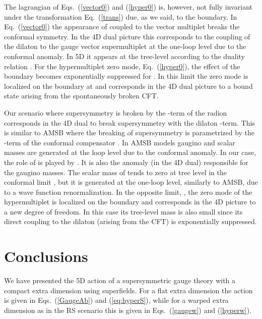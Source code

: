 \documentclass[a4paper,12pt]{article}
\begin{document}
The lagrangian  of Eqs.~(\ref{vector0}) 
and (\ref{hyper0})
is, however,  not fully invariant under the transformation
Eq.~(\ref{trans}) due, as we said,  
to the  \coordHE{} boundary.
In Eq.~(\ref{vector0}) 
the appearance  of \coordHE{} coupled to the vector multiplet
breaks the conformal symmetry.
In the 4D dual picture this corresponds to 
the coupling of  the dilaton  to the gauge vector supermultiplet
at the one-loop level due to the conformal anomaly.
In 5D it appears at 
the tree-level according to the 
duality relation \cite{arp}
\coordHE{}.
For the hypermultiplet zero mode, Eq.~(\ref{hyper0}),
the effect of the 
\coordHE{} boundary
becomes exponentially suppressed 
for \coordHE{}. In this limit the zero mode
is localized on the  boundary at \coordHE{} and 
corresponds in the 4D dual picture to a bound state arising from the 
spontaneously broken CFT.


Our scenario where supersymmetry is broken by the \coordHE{}-term
of the radion corresponds in the 4D dual 
to break supersymmetry
with the dilaton \coordHE{}-term.
This is 
similar to AMSB where the breaking
of supersymmetry is parametrized by the \coordHE{}-term of 
the conformal compensator \myHighlight{$\varphi$}\coordHE{}.
In AMSB models
gaugino and scalar masses are generated at the loop level
due to the conformal anomaly.
In our case, the role of \myHighlight{$\varphi$}\coordHE{} is played by \coordHE{}. 
It is also the anomaly (in the 4D dual)  responsible for the 
gaugino masses. 
The scalar mass of \myHighlight{$\phi$}\coordHE{} tends to zero at tree level
in the conformal limit \coordHE{}, 
but it is generated at the one-loop level, similarly to  AMSB,
due to a wave function renormalization. 
In the opposite limit, 
\coordHE{}, the zero mode of the hypermultiplet is localized
on the \coordHE{} boundary and corresponds in the 4D picture
to a new degree of
freedom.
In this case its  tree-level mass 
is also small since its direct coupling to the dilaton (arising from the CFT)
is exponentially suppressed.


\section{Conclusions}


We have presented the 5D action 
of a 
  supersymmetric gauge theory with 
a compact  extra dimension
using  \coordHE{} superfields. 
For a flat extra dimension the
action is given in
Eqs.~(\ref{GaugeAb}) and (\ref{eq:hyperS}), while 
for a warped extra dimension as in the RS scenario
this  is given in
Eqs.~(\ref{gaugew}) and (\ref{hyperw}).
\end{document}
